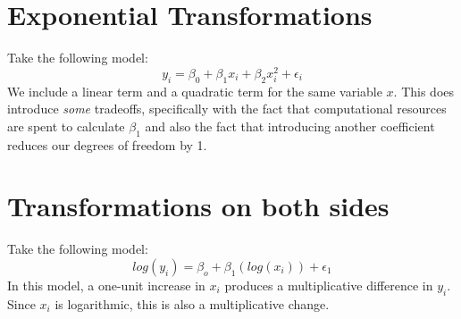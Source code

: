 \documentclass[titlepage, 12pt, leqno]{article}
\begin{document}
\pagebreak
\section{Exponential Transformations}
Take the following model:
\[
    y_i = \beta_0 + \beta_1x_{i} + \beta_2x_{i}^2 + \epsilon_i
\]
We include a linear term and a quadratic term for the same variable $x$. This does
introduce \textit{some} tradeoffs, specifically with the fact that computational
resources are spent to calculate $\beta_1$ and also the fact that introducing 
another coefficient reduces our degrees of freedom by 1.

\pagebreak
\section{Transformations on both sides}
Take the following model:
\[
    log(y_i) = \beta_o + \beta_1(log(x_i)) + \epsilon_1
\]
In this model, a one-unit increase in $x_i$ produces a multiplicative difference
in $y_i$. Since $x_i$ is logarithmic, this is also a multiplicative change.
\end{document}
